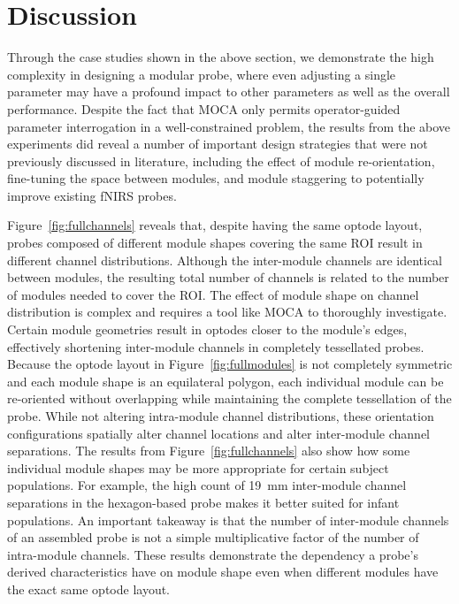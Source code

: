 \section{Discussion}
\label{chap:moca:discussion}
Through the case studies shown in the above section, we demonstrate the high complexity in designing a modular probe, where even adjusting a single parameter may have a profound impact to other parameters as well as the overall performance. Despite the fact that \ac{MOCA} only permits operator-guided parameter interrogation in a well-constrained problem, the results from the above experiments did reveal a number of important design strategies that were not previously discussed in literature, including the effect of module re-orientation, fine-tuning the space between modules, and module staggering to potentially improve existing \ac{fNIRS} probes.

Figure~\ref{fig:fullchannels} reveals that, despite having the same optode layout, probes composed of different module shapes covering the same \ac{ROI} result in different channel distributions. Although the inter-module channels are identical between modules, the resulting total number of channels is related to the number of modules needed to cover the \ac{ROI}. The effect of module shape on channel distribution is complex and requires a tool like \ac{MOCA} to thoroughly investigate. Certain module geometries result in optodes closer to the module's edges, effectively shortening inter-module channels in completely tessellated probes. Because the optode layout in Figure~\ref{fig:fullmodules} is not completely symmetric and each module shape is an equilateral polygon, each individual module can be re-oriented without overlapping while maintaining the complete tessellation of the probe. While not altering intra-module channel distributions, these orientation configurations spatially alter channel locations and alter inter-module channel separations. The results from Figure~\ref{fig:fullchannels} also show how some individual module shapes may be more appropriate for certain subject populations. For example, the high count of 19~mm inter-module channel separations in the hexagon-based probe makes it better suited for infant populations. An important takeaway is that the number of inter-module channels of an assembled probe is not a simple multiplicative factor of the number of intra-module channels. These results demonstrate the dependency a probe's derived characteristics have on module shape even when different modules have the exact same optode layout. 


